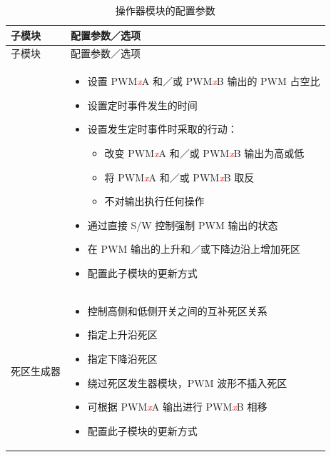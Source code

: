 \begin{longtable}[c]{|p{4cm}|p{11cm}|}
\caption{操作器模块的配置参数}
\label{table:para_sub_operator}
    \\\hline
    \rowcolor{lightgray}
 子模块 & 配置参数／选项 \\ \hline 

\endfirsthead\hline
 \rowcolor{lightgray}
  子模块 & 配置参数／选项\\
 \hline 
\endhead
\endfoot

\multirow{10}{*}{PWM 生成器} &
    \vspace{-1em}
    \begin{itemize}
        \item  
        设置 PWM\textcolor{red}{\it{x}}A 和／或 PWM\textcolor{red}{\it{x}}B 输出的 PWM 占空比
        \item 设置定时事件发生的时间
        \item 设置发生定时事件时采取的行动：
        \begin{itemize}
           \item 改变 PWM\textcolor{red}{\it{x}}A 和／或 PWM\textcolor{red}{\it{x}}B 输出为高或低
           \item 将 PWM\textcolor{red}{\it{x}}A 和／或 PWM\textcolor{red}{\it{x}}B 取反
           \item 不对输出执行任何操作
        \end{itemize}
        \item 通过直接 S/W 控制强制 PWM 输出的状态
        \item 
        在 PWM 输出的上升和／或下降边沿上增加死区
        \item 配置此子模块的更新方式
     \vspace{-1em}\end{itemize} \\\hline
     
\multirow{7}{*}{死区生成器}  &
    \vspace{-1em}\begin{itemize}
        \item 
        控制高侧和低侧开关之间的互补死区关系
        \item 指定上升沿死区
        \item 指定下降沿死区
        \item 绕过死区发生器模块，PWM 波形不插入死区
        \item 可根据 PWM\textcolor{red}{\it{x}}A 输出进行 PWM\textcolor{red}{\it{x}}B 相移
        \item 配置此子模块的更新方式
    \vspace{-1em}\end{itemize}\\\hline
    

\end{longtable}
